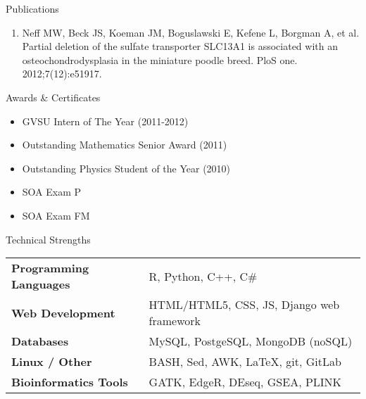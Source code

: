 \documentclass{resume} %
\begin{document}

\begin{rSection}{Publications}
\begin{enumerate}
\item Neff MW, Beck JS, Koeman JM, Boguslawski E, Kefene L, Borgman A, et al. Partial deletion of the sulfate transporter SLC13A1 is associated with an osteochondrodysplasia in the miniature poodle breed. PloS one. 2012;7(12):e51917.
\end{enumerate}
\end{rSection}


\begin{rSection}{Awards \& Certificates}
\begin{itemize}
\item GVSU Intern of The Year (2011-2012)
\item Outstanding Mathematics Senior Award (2011)
\item Outstanding Physics Student of the Year (2010)
\item SOA Exam P
\item SOA Exam FM
\end{itemize}
\end{rSection}



\begin{rSection}{Technical Strengths}

\begin{tabular}{ @{} >{\bfseries}l @{\hspace{6ex}} l }
Programming Languages & R, Python, C++, C\# \\
Web Development & HTML/HTML5, CSS, JS, Django web framework \\
Databases & MySQL, PostgeSQL, MongoDB (noSQL) \\
Linux / Other & BASH, Sed, AWK, LaTeX, git, GitLab \\
Bioinformatics Tools & GATK, EdgeR, DEseq, GSEA, PLINK
\end{tabular}

\end{rSection}
\end{document}
